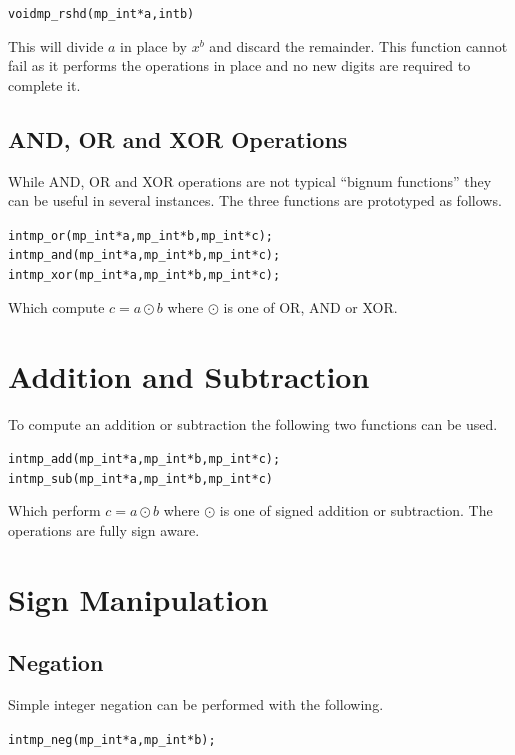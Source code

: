 \documentclass[synpaper]{book}
\begin{document}
\begin{alltt}
void mp_rshd (mp_int * a, int b)
\end{alltt}
This will divide $a$ in place by $x^b$ and discard the remainder.  This function cannot fail as it performs the operations
in place and no new digits are required to complete it.

\subsection{AND, OR and XOR Operations}

While AND, OR and XOR operations are not typical ``bignum functions'' they can be useful in several instances.  The
three functions are prototyped as follows.

  
\begin{alltt}
int mp_or  (mp_int * a, mp_int * b, mp_int * c);
int mp_and (mp_int * a, mp_int * b, mp_int * c);
int mp_xor (mp_int * a, mp_int * b, mp_int * c);
\end{alltt}

Which compute $c = a \odot b$ where $\odot$ is one of OR, AND or XOR.  

\section{Addition and Subtraction}

To compute an addition or subtraction the following two functions can be used.

 
\begin{alltt}
int mp_add (mp_int * a, mp_int * b, mp_int * c);
int mp_sub (mp_int * a, mp_int * b, mp_int * c)
\end{alltt}

Which perform $c = a \odot b$ where $\odot$ is one of signed addition or subtraction.  The operations are fully sign
aware.

\section{Sign Manipulation}
\subsection{Negation}
\label{sec:NEG}
Simple integer negation can be performed with the following.

\begin{alltt}
int mp_neg (mp_int * a, mp_int * b);
\end{alltt}
\end{document}
